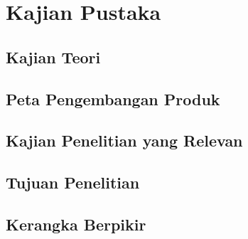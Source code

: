 \chapter{Kajian Pustaka}
\section{Kajian Teori}
\section{Peta Pengembangan Produk}
\section{Kajian Penelitian yang Relevan}
\section{Tujuan Penelitian}
\section{Kerangka Berpikir}

